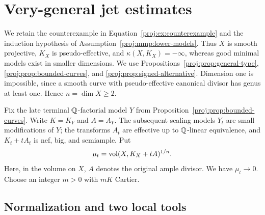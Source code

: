\section{Very-general jet estimates}\label{proj:sec:jets}

We retain the counterexample in Equation~\eqref{proj:ex:counterexample}
and the induction hypothesis of Assumption~\ref{proj:mmp:lower-models}.
Thus \(X\) is smooth projective,
\(K_X\) is pseudo-effective, and \(\kappa(X,K_X)=-\infty\), whereas
good minimal models exist in smaller dimensions.  We use
Propositions~\ref{proj:prop:general-type}, \ref{proj:prop:bounded-curves}, and
\ref{proj:prop:signed-alternative}.  Dimension one is impossible, since a
smooth curve with pseudo-effective canonical divisor has genus at least
one.  Hence \(n=\dim X\ge2\).

Fix the late terminal \(\mathbb{Q}\)-factorial model \(Y\) from
Proposition~\ref{proj:prop:bounded-curves}.  Write \(K=K_Y\) and \(A=A_Y\).
The subsequent scaling models \(Y_t\) are small modifications of \(Y\);
the transforms \(A_t\) are effective up to \(\mathbb{Q}\)-linear equivalence,
and \(K_t+tA_t\) is nef, big, and semiample.  Put
\[
 \mu_t=\operatorname{vol}(X,K_X+tA)^{1/n}.
\]
Here, in the volume on \(X\), \(A\) denotes the original ample divisor.
We have \(\mu_t\to0\).  Choose an integer \(m>0\) with \(mK\) Cartier.

\subsection{Normalization and two local tools}

